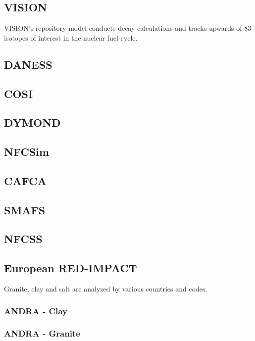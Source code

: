 \subsection{VISION}
VISION's repository model conducts decay calculations and tracks 
upwards of 83 isotopes of interest in the nuclear fuel cycle.  
\cite{yacout_visionverifiable_2006} 

\subsection{DANESS}

\subsection{COSI}

\subsection{DYMOND}

\subsection{NFCSim}

\subsection{CAFCA}

\subsection{SMAFS}

\subsection{NFCSS}

\subsection{European RED-IMPACT}
Granite, clay and salt are analyzed by various countries and codes.

\subsubsection{ANDRA - Clay}
\subsubsection{ANDRA - Granite}

